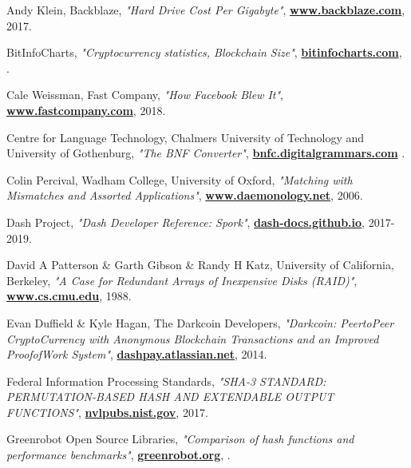 \documentclass[10pt,a4paper,final]{article}
\let\oldhref\href
\renewcommand{\href}[2]{\oldhref{#1}{\bfseries#2}}
\begin{document}
\begin{thebibliography}{999}

	Andy Klein, Backblaze,
	\emph{"Hard Drive Cost Per Gigabyte"},
	\href{https://www.backblaze.com/blog/hard-drive-cost-per-gigabyte}{www.backblaze.com},
	2017.

	BitInfoCharts,
	\emph{"Cryptocurrency statistics, Blockchain Size"},
	\href{https://bitinfocharts.com}{bitinfocharts.com},
	\the\year{}.

	Cale Weissman, Fast Company,
	\emph{"How Facebook Blew It"},
	\href{https://www.fastcompany.com/40550423/how-facebook-blew-it}{www.fastcompany.com},
	2018.

	Centre for Language Technology, Chalmers University of Technology and University of Gothenburg,
	\emph{"The BNF Converter"},
	\href{https://bnfc.digitalgrammars.com/}{bnfc.digitalgrammars.com}
	\the\year{}.

	Colin Percival, Wadham College, University of Oxford,
	\emph{"Matching with Mismatches and Assorted Applications"},
	\href{http://www.daemonology.net/papers/thesis.pdf}{www.daemonology.net},
	2006.

	Dash Project,
	\emph{"Dash Developer Reference: Spork"},
	\href{https://dash-docs.github.io/en/developer-reference\%23spork}{dash-docs.github.io},
	2017-2019.

	David A Patterson \& Garth Gibson \& Randy H Katz, University of California, Berkeley,
	\emph{"A Case for Redundant Arrays of Inexpensive Disks (RAID)"},
	\href{https://www.cs.cmu.edu/~garth/RAIDpaper/Patterson88.pdf}{www.cs.cmu.edu},
	1988.

	Evan Duffield \& Kyle Hagan, The Darkcoin Developers,
	\emph{"Darkcoin: Peer­to­Peer Crypto­Currency with Anonymous Blockchain Transactions and an Improved Proof­of­Work System"},
	\href{https://dashpay.atlassian.net/wiki/download/attachments/132120878/Darkcoin\%20Whitepaper.pdf}{dashpay.atlassian.net},
	2014.

	Federal Information Processing Standards,
	\emph{"SHA-3 STANDARD: PERMUTATION-BASED HASH AND EXTENDABLE OUTPUT FUNCTIONS"},
	\href{https://nvlpubs.nist.gov/nistpubs/FIPS/NIST.FIPS.202.pdf}{nvlpubs.nist.gov},
	2017.

	Greenrobot Open Source Libraries,
	\emph{"Comparison of hash functions and performance benchmarks"},
	\href{https://greenrobot.org/essentials/features/performant-hash-functions-for-java/comparison-of-hash-functions}{greenrobot.org},
	\the\year{}.



\end{thebibliography}
\end{document}
